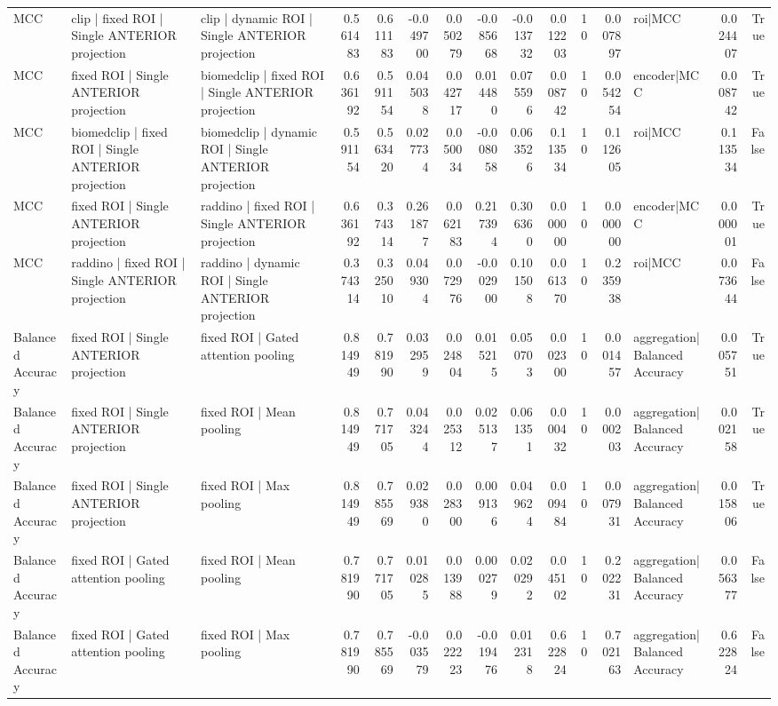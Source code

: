 \begin{table}
\begin{tabular}{lllrrrrrrrrrlrr}
MCC & clip | fixed ROI | Single ANTERIOR projection & clip | dynamic ROI | Single ANTERIOR projection & 0.561483 & 0.611183 & -0.049700 & 0.050279 & -0.085668 & -0.013732 & 0.012203 & 10 & 0.007897 & roi|MCC & 0.024407 & True \\
MCC & fixed ROI | Single ANTERIOR projection & biomedclip | fixed ROI | Single ANTERIOR projection & 0.636192 & 0.591154 & 0.045038 & 0.042717 & 0.014480 & 0.075596 & 0.008742 & 10 & 0.054254 & encoder|MCC & 0.008742 & True \\
MCC & biomedclip | fixed ROI | Single ANTERIOR projection & biomedclip | dynamic ROI | Single ANTERIOR projection & 0.591154 & 0.563420 & 0.027734 & 0.050034 & -0.008058 & 0.063526 & 0.113534 & 10 & 0.112605 & roi|MCC & 0.113534 & False \\
MCC & fixed ROI | Single ANTERIOR projection & raddino | fixed ROI | Single ANTERIOR projection & 0.636192 & 0.374314 & 0.261877 & 0.062183 & 0.217394 & 0.306360 & 0.000000 & 10 & 0.000000 & encoder|MCC & 0.000001 & True \\
MCC & raddino | fixed ROI | Single ANTERIOR projection & raddino | dynamic ROI | Single ANTERIOR projection & 0.374314 & 0.325010 & 0.049304 & 0.072976 & -0.002900 & 0.101508 & 0.061370 & 10 & 0.235938 & roi|MCC & 0.073644 & False \\
Balanced Accuracy & fixed ROI | Single ANTERIOR projection & fixed ROI | Gated attention pooling & 0.814949 & 0.781990 & 0.032959 & 0.024804 & 0.015215 & 0.050703 & 0.002300 & 10 & 0.001457 & aggregation|Balanced Accuracy & 0.005751 & True \\
Balanced Accuracy & fixed ROI | Single ANTERIOR projection & fixed ROI | Mean pooling & 0.814949 & 0.771705 & 0.043244 & 0.025312 & 0.025137 & 0.061351 & 0.000432 & 10 & 0.000203 & aggregation|Balanced Accuracy & 0.002158 & True \\
Balanced Accuracy & fixed ROI | Single ANTERIOR projection & fixed ROI | Max pooling & 0.814949 & 0.785569 & 0.029380 & 0.028300 & 0.009136 & 0.049624 & 0.009484 & 10 & 0.007931 & aggregation|Balanced Accuracy & 0.015806 & True \\
Balanced Accuracy & fixed ROI | Gated attention pooling & fixed ROI | Mean pooling & 0.781990 & 0.771705 & 0.010285 & 0.013988 & 0.000279 & 0.020292 & 0.045102 & 10 & 0.202231 & aggregation|Balanced Accuracy & 0.056377 & False \\
Balanced Accuracy & fixed ROI | Gated attention pooling & fixed ROI | Max pooling & 0.781990 & 0.785569 & -0.003579 & 0.022223 & -0.019476 & 0.012318 & 0.622824 & 10 & 0.702163 & aggregation|Balanced Accuracy & 0.622824 & False \\

\end{tabular}
\end{table}
